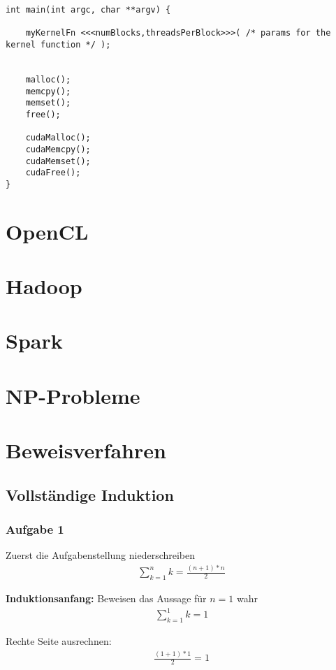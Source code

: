 \documentclass{article}
\begin{document}
\begin{multicols}{2}
\begin{verbatim}
int main(int argc, char **argv) {    

    myKernelFn <<<numBlocks,threadsPerBlock>>>( /* params for the kernel function */ );       


    malloc();
    memcpy();
    memset();
    free();

    cudaMalloc();
    cudaMemcpy();
    cudaMemset();
    cudaFree();
}
\end{verbatim}

\section{OpenCL}

\section{Hadoop}

\section{Spark}

\section{NP-Probleme}

\section{Beweisverfahren}

\subsection{Vollständige Induktion}


\subsubsection{Aufgabe 1}

\noindent Zuerst die Aufgabenstellung niederschreiben
\begin{align*}
    \sum_{k=1}^{n}k = \frac{(n + 1) * n}{2}
\end{align*}


\noindent \textbf{Induktionsanfang:} Beweisen das Aussage für $ n  = 1 $ wahr 
\begin{align*}
    \sum_{k=1}^{1}k = 1
\end{align*}

\noindent Rechte Seite ausrechnen:
\begin{align*}
    \frac{(1 + 1) * 1}{2} = 1
\end{align*}



\end{multicols}
\end{document}
